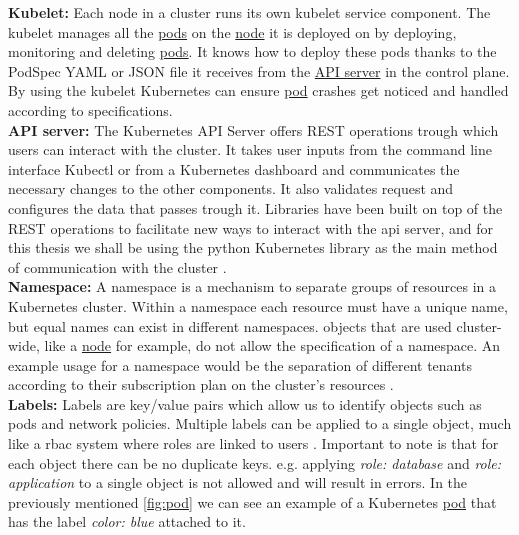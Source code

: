 \textbf{Kubelet:} \label{comp:kubelet} Each node in a cluster runs its own kubelet service component. The kubelet manages all the \hyperref[comp:pod]{pods} on the \hyperref[comp:node]{node} it is deployed on by deploying, monitoring and deleting \hyperref[comp:pod]{pods}. It knows how to deploy these pods thanks to the PodSpec YAML or JSON file it receives from the \hyperref[comp:apiserver]{API server} in the control plane. By using the kubelet Kubernetes can ensure \hyperref[comp:pod]{pod} crashes get noticed and handled according to specifications. \cite{kubelet}
\\[10pt]

\textbf{API server:} \label{comp:apiserver} The Kubernetes API Server offers REST operations trough which users can interact with the cluster. It takes user inputs from the command line interface Kubectl or from a Kubernetes dashboard and communicates the necessary changes to the other components. It also validates request and configures the data that passes trough it. Libraries have been built on top of the REST operations to facilitate new ways to interact with the api server, and for this thesis we shall be using the python Kubernetes library as the main method of communication with the cluster \cite{pythonk8s} \cite{kubeapiserver}.
\\[10pt]


\textbf{Namespace:} \label{comp:namespace} A namespace is a mechanism to separate groups of resources in a Kubernetes cluster. Within a namespace each resource must have a unique name, but equal names can exist in different namespaces. objects that are used cluster-wide, like a \hyperref[comp:node]{node} for example, do not allow the specification of a namespace. An example usage for a namespace would be the separation of different tenants according to their subscription plan on the cluster's resources \cite{namespace} \cite{feasability}.
\\[10pt]


\textbf{Labels:} \label{comp:label} Labels are key/value pairs which allow us to identify objects such as pods and network policies. Multiple labels can be applied to a single object, much like a \acrfull{rbac} system where roles are linked to users \cite{rbac}. Important to note is that for each object there can be no duplicate keys. e.g. applying \textit{role: database} and \textit{role: application} to a single object is not allowed and will result in errors. In the previously mentioned \autoref{fig:pod} we can see an example of a Kubernetes \hyperref[comp:pod]{pod} that has the label \textit{color: blue} attached to it. 
\\[5pt]

